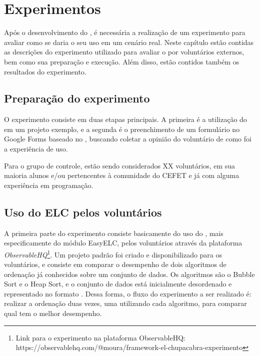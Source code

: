 \documentclass[12pt]{tcc}
\begin{document}
\chapter{Experimentos}
	\label{cap:experimentos}

	Após o desenvolvimento do , é necessária a realização de um experimento para avaliar como se daria o seu uso em um cenário real. Neste capítulo estão contidas as descrições do experimento utilizado para avaliar o  por voluntários externos, bem como sua preparação e execução. Além disso, estão contidos também os resultados do experimento.

	\section{Preparação do experimento}
	\label{section:preparacao-experimento}

	O experimento consiste em duas etapas principais. A primeira é a utilização do  em um projeto exemplo, e a segunda é o preenchimento de um formulário no Google Forms baseado no , buscando coletar a opinião do voluntário de como foi a experiência de uso.

	Para o grupo de controle, estão sendo considerados XX voluntários, em sua maioria alunos e/ou pertencentes à comunidade do CEFET e já com alguma experiência em programação. 


	\section{Uso do ELC pelos voluntários}
	\label{section:parte-1-experimento}




	A primeira parte do experimento consiste basicamente do uso do , mais especificamente do módulo EasyELC, pelos voluntários através da plataforma \emph{ObservableHQ}\footnote{Link para o experimento na plataforma ObservableHQ: https://observablehq.com/@moura/framework-el-chupacabra-experimento}. Um projeto padrão foi criado e disponibilizado para os voluntários, e consiste em comparar o desempenho de dois algoritmos de ordenação já conhecidos sobre um conjunto de dados. Os algoritmos são o Bubble Sort e o Heap Sort, e o conjunto de dados está inicialmente desordenado e representado no formato . Dessa forma, o fluxo do experimento a ser realizado é: realizar a ordenação duas vezes, uma utilizando cada algoritmo, para comparar qual tem o melhor desempenho.
\end{document}
